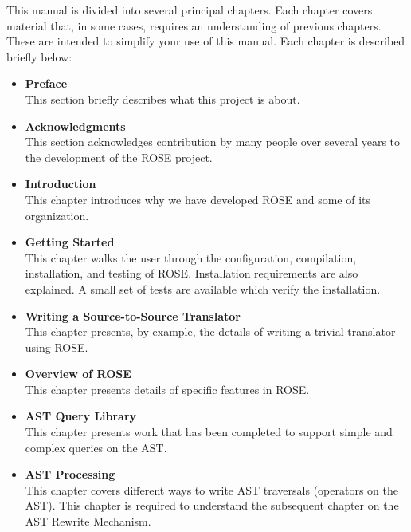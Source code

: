 This manual is divided into several principal chapters.
Each chapter covers material that, in some cases, requires an understanding of
previous chapters. These are intended to simplify your use of this manual.
Each chapter is described briefly below:
\begin{itemize}
   \item {\bf Preface} \\
      This section briefly describes what this project is about.

   \item {\bf Acknowledgments} \\
      This section acknowledges contribution by many people over several years to the
      development of the ROSE project.

   \item {\bf Introduction} \\
      This chapter introduces why we have developed ROSE and some of its organization.

   \item {\bf Getting Started} \\
      This chapter walks the user through the configuration, compilation, installation,
      and testing of ROSE. Installation requirements are also explained. A small set of tests
      are available which verify the installation.

   \item {\bf Writing a Source-to-Source Translator} \\
      This chapter presents, by example, the details of writing a trivial translator using
      ROSE. 

   \item {\bf Overview of ROSE} \\
      This chapter presents details of specific features in ROSE.

   \item {\bf AST Query Library} \\
      This chapter presents work that has been completed to support simple and complex queries on the AST.

   \item {\bf AST Processing} \\
      This chapter covers different ways to write AST traversals (operators on the
      AST). This chapter 
      is required to understand the subsequent chapter on the AST Rewrite Mechanism.


\end{itemize}
